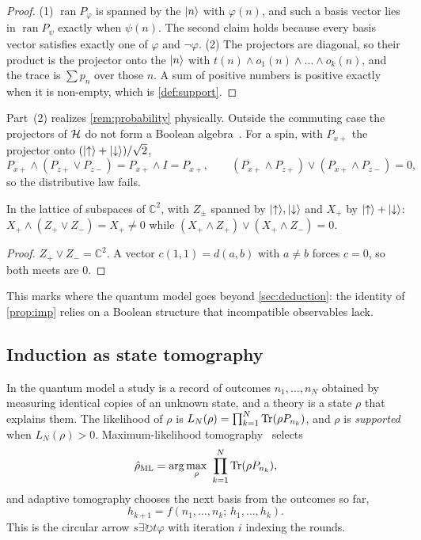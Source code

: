 \begin{proof}
(1) $\operatorname{ran}P_\varphi$ is spanned by the $\lvert n\rangle$ with $\varphi(n)$, and such a basis vector
lies in $\operatorname{ran}P_\psi$ exactly when $\psi(n)$. The second claim holds because every
basis vector satisfies exactly one of $\varphi$ and $\neg\varphi$.
(2) The projectors are diagonal, so their product is the projector onto the $\lvert n\rangle$ with
$t(n)\wedge o_1(n)\wedge\dots\wedge o_k(n)$, and the trace is $\sum p_n$ over those $n$. A sum of
positive numbers is positive exactly when it is non-empty, which is \cref{def:support}.
\end{proof}

Part~(2) realizes \cref{rem:probability} physically. Outside the commuting case the projectors
of $\mathcal H$ do not form a Boolean algebra~\cite{birkhoff,vonneumann}. For a spin, with $P_{x+}$ the
projector onto $(\lvert {\uparrow}\rangle+\lvert {\downarrow}\rangle)/\sqrt2$,
\[
  P_{x+}\wedge(P_{z+}\vee P_{z-})=P_{x+}\wedge I=P_{x+},
  \qquad
  (P_{x+}\wedge P_{z+})\vee(P_{x+}\wedge P_{z-})=0,
\]
so the distributive law fails.

\begin{proposition}\label{prop:nondistrib}
In the lattice of subspaces of $\mathbb C^2$, with $Z_\pm$ spanned by $\lvert {\uparrow}\rangle,\lvert {\downarrow}\rangle$ and $X_+$
by $\lvert {\uparrow}\rangle+\lvert {\downarrow}\rangle$: $X_+\wedge(Z_+\vee Z_-)=X_+\ne0$ while
$(X_+\wedge Z_+)\vee(X_+\wedge Z_-)=0$.
\end{proposition}

\begin{proof}
$Z_+\vee Z_-=\mathbb C^2$. A vector $c(1,1)=d(a,b)$ with $a\ne b$ forces $c=0$, so both meets are $0$.
\end{proof}

This marks where the quantum model goes beyond
\cref{sec:deduction}: the identity of \cref{prop:imp} relies on a Boolean structure that
incompatible observables lack.

\subsection{Induction as state tomography}

In the quantum model a study is a record of outcomes $n_1,\dots,n_N$ obtained by measuring
identical copies of an unknown state, and a theory is a state $\rho$ that explains them. The
likelihood of $\rho$ is $L_N(\rho)=\prod_{k=1}^N\operatorname{Tr}(\rho P_{n_k})$, and $\rho$ is \emph{supported}
when $L_N(\rho)>0$. Maximum-likelihood tomography~\cite{hradil} selects
\[
  \hat\rho_{\mathrm{ML}}=\arg\max_\rho\ \prod_{k=1}^N\Tr(\rho P_{n_k}),
\]
and adaptive tomography chooses the next basis from the outcomes so far,
\[
  h_{k+1}=f(n_1,\dots,n_k;\,h_1,\dots,h_k).
\]
This is the circular arrow $s\exists\circlearrowright
t\varphi$ with iteration $i$ indexing the rounds.

